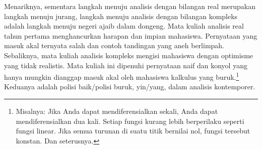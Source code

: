 Menariknya, sementara langkah menuju analisis dengan bilangan real merupakan
langkah menuju jurang, langkah menuju analisis dengan bilangan kompleks adalah
langkah menuju negeri ajaib dalam dongeng.
Mata kuliah analisis real tahun pertama menghancurkan harapan dan impian
mahasiswa.
Pernyataan yang masuk akal ternyata salah dan contoh tandingan yang aneh
berlimpah.
Sebaliknya, mata kuliah analisis kompleks mengisi mahasiswa dengan optimisme
yang tidak realistis.
Mata kuliah ini dipenuhi pernyataan naif dan konyol yang hanya mungkin
dianggap masuk akal oleh mahasiswa kalkulus yang buruk.\footnote{%
Misalnya: Jika Anda dapat mendiferensialkan sekali, Anda dapat
mendiferensialkan dua kali.
Setiap fungsi kurang lebih berperilaku seperti fungsi linear.
Jika semua turunan di suatu titik bernilai nol, fungsi tersebut konstan.
Dan seterusnya.}
Keduanya adalah polisi baik/polisi buruk, yin/yang,
dalam analisis kontemporer.
